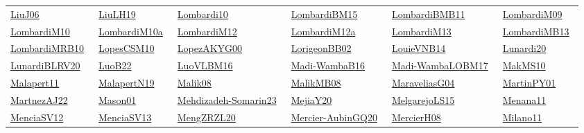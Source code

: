 \begin{longtable}{*{6}{l}}
\href{works/LiuJ06.pdf}{LiuJ06}~\cite{LiuJ06} & \href{works/LiuLH19.pdf}{LiuLH19}~\cite{LiuLH19} & \href{works/Lombardi10.pdf}{Lombardi10}~\cite{Lombardi10} & \href{works/LombardiBM15.pdf}{LombardiBM15}~\cite{LombardiBM15} & \href{works/LombardiBMB11.pdf}{LombardiBMB11}~\cite{LombardiBMB11} & \href{works/LombardiM09.pdf}{LombardiM09}~\cite{LombardiM09}\\ 
\href{works/LombardiM10.pdf}{LombardiM10}~\cite{LombardiM10} & \href{works/LombardiM10a.pdf}{LombardiM10a}~\cite{LombardiM10a} & \href{works/LombardiM12.pdf}{LombardiM12}~\cite{LombardiM12} & \href{works/LombardiM12a.pdf}{LombardiM12a}~\cite{LombardiM12a} & \href{works/LombardiM13.pdf}{LombardiM13}~\cite{LombardiM13} & \href{}{LombardiMB13}~\cite{LombardiMB13}\\ 
\href{works/LombardiMRB10.pdf}{LombardiMRB10}~\cite{LombardiMRB10} & \href{works/LopesCSM10.pdf}{LopesCSM10}~\cite{LopesCSM10} & \href{works/LopezAKYG00.pdf}{LopezAKYG00}~\cite{LopezAKYG00} & \href{works/LorigeonBB02.pdf}{LorigeonBB02}~\cite{LorigeonBB02} & \href{works/LouieVNB14.pdf}{LouieVNB14}~\cite{LouieVNB14} & \href{works/Lunardi20.pdf}{Lunardi20}~\cite{Lunardi20}\\ 
\href{works/LunardiBLRV20.pdf}{LunardiBLRV20}~\cite{LunardiBLRV20} & \href{works/LuoB22.pdf}{LuoB22}~\cite{LuoB22} & \href{works/LuoVLBM16.pdf}{LuoVLBM16}~\cite{LuoVLBM16} & \href{works/Madi-WambaB16.pdf}{Madi-WambaB16}~\cite{Madi-WambaB16} & \href{works/Madi-WambaLOBM17.pdf}{Madi-WambaLOBM17}~\cite{Madi-WambaLOBM17} & \href{works/MakMS10.pdf}{MakMS10}~\cite{MakMS10}\\ 
\href{works/Malapert11.pdf}{Malapert11}~\cite{Malapert11} & \href{works/MalapertN19.pdf}{MalapertN19}~\cite{MalapertN19} & \href{works/Malik08.pdf}{Malik08}~\cite{Malik08} & \href{works/MalikMB08.pdf}{MalikMB08}~\cite{MalikMB08} & \href{works/MaraveliasG04.pdf}{MaraveliasG04}~\cite{MaraveliasG04} & \href{works/MartinPY01.pdf}{MartinPY01}~\cite{MartinPY01}\\ 
\href{}{MartnezAJ22}~\cite{MartnezAJ22} & \href{works/Mason01.pdf}{Mason01}~\cite{Mason01} & \href{works/Mehdizadeh-Somarin23.pdf}{Mehdizadeh-Somarin23}~\cite{Mehdizadeh-Somarin23} & \href{works/MejiaY20.pdf}{MejiaY20}~\cite{MejiaY20} & \href{works/MelgarejoLS15.pdf}{MelgarejoLS15}~\cite{MelgarejoLS15} & \href{works/Menana11.pdf}{Menana11}~\cite{Menana11}\\ 
\href{works/MenciaSV12.pdf}{MenciaSV12}~\cite{MenciaSV12} & \href{works/MenciaSV13.pdf}{MenciaSV13}~\cite{MenciaSV13} & \href{works/MengZRZL20.pdf}{MengZRZL20}~\cite{MengZRZL20} & \href{works/Mercier-AubinGQ20.pdf}{Mercier-AubinGQ20}~\cite{Mercier-AubinGQ20} & \href{works/MercierH08.pdf}{MercierH08}~\cite{MercierH08} & \href{}{Milano11}~\cite{Milano11}\\ 

\end{longtable}
